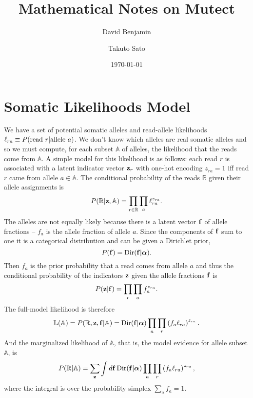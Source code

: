 \documentclass[nofootinbib,amssymb,amsmath]{revtex4}
\newcommand{\vf}{{\bf f}}
\newcommand{\vz}{{\bf z}}
\newcommand{\valpha}{{\bm{\alpha}}}
\begin{document}
\title{Mathematical Notes on Mutect}
\author{David Benjamin}
\author{Takuto Sato}

\date{\today}

\maketitle

\section{Somatic Likelihoods Model}\label{introduction}

We have a set of potential somatic alleles and read-allele likelihoods $\ell_{ra} \equiv P({\rm read~}r|{\rm allele~}a)$.  We don't know which alleles are real somatic alleles and so we must compute, for each subset $\mathbb{A}$ of alleles, the likelihood that the reads come from $\mathbb{A}$.  A simple model for this likelihood is as follows: each read $r$ is associated with a latent indicator vector $\vz_r$ with one-hot encoding $z_{ra} = 1$ iff read $r$ came from allele $a \in \mathbb{A}$.  The conditional probability of the reads $\mathbb{R}$ given their allele assignments is
\begin{equation}
P( \mathbb{R} | \vz, \mathbb{A}) = \prod_{r \in \mathbb{R}} \prod_a \ell_{ra}^{z_{ra}}.
\end{equation}
The alleles are not equally likely because there is a latent vector $\vf$ of allele fractions -- $f_a$ is the allele fraction of allele $a$.  Since the components of $\vf$ sum to one it is a categorical distribution and can be given a Dirichlet prior,
\begin{equation}
P(\vf) = {\rm Dir}(\vf | \valpha).
\end{equation}
Then $f_a$ is the prior probability that a read comes from allele $a$ and thus the conditional probability of the indicators $\vz$ given the allele fractions $\vf$ is
\begin{equation}
P(\vz | \vf) = \prod_r \prod_a f_a^{z_{ra}}.
\end{equation}
The full-model likelihood is therefore
\begin{equation}
\mathbb{L}(\mathbb{A}) = P(\mathbb{R}, \vz, \vf | \mathbb{A}) = {\rm Dir}(\vf | \valpha) \prod_a  \prod_r \left( f_a \ell_{ra}\right)^{z_{ra}}.
\label{full_likelihood}
\end{equation}
And the marginalized likelihood of $\mathbb{A}$, that is, the model evidence for allele subset $\mathbb{A}$, is
\begin{equation}
P(\mathbb{R} | \mathbb{A}) = \sum_\vz \int d \vf \, {\rm Dir}(\vf | \valpha) \prod_a  \prod_r \left( f_a \ell_{ra}\right)^{z_{ra}},
\label{evidence}
\end{equation}
where the integral is over the probability simplex $\sum_a f_a = 1$.
\end{document}

